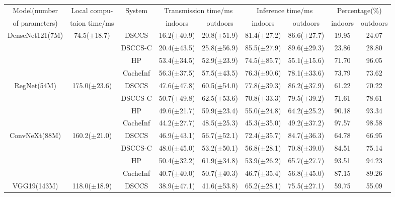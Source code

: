 \begin{table}[htb]

    \centering
\begin{tabular}{ccc|c|c|c|c|c|c}
\toprule
 Model(number&  Local compu- & \multirow[c]{2}{*}{System} & \multicolumn{2}{|c|}{Transmission time/ms} & \multicolumn{2}{|c|}{Inference time/ms} & \multicolumn{2}{c}{Percentage(\%)} \\
 of parameters) & taion time/ms &  & indoors & outdoors & indoors & outdoors & indoors & outdoors \\
\midrule
\multirow[c]{4}{*}{DenseNet121(7M)} & \multirow[c]{4}{*}{74.5($\pm$18.7)} & DSCCS & 16.2($\pm$40.9) & 20.8($\pm$51.9) & 81.4($\pm$27.2) & 86.6($\pm$27.7) & 19.95 & 24.07 \\
 &  & DSCCS-C & 20.4($\pm$43.5) & 25.8($\pm$56.9) & 85.5($\pm$27.9) & 89.6($\pm$29.3) & 23.86 & 28.80 \\
 &  & HP & 53.4($\pm$34.5) & 52.9($\pm$23.9) & 74.5($\pm$85.7) & 55.1($\pm$15.6) & 71.70 & 96.05 \\
 &  & CacheInf & 56.3($\pm$37.5) & 57.5($\pm$43.5) & 76.3($\pm$90.6) & 78.1($\pm$33.6) & 73.79 & 73.62 \\
\cline{1-9} \cline{2-9}
\multirow[c]{4}{*}{RegNet(54M)} & \multirow[c]{4}{*}{175.0($\pm$23.6)} & DSCCS & 47.6($\pm$47.8) & 60.5($\pm$54.0) & 77.8($\pm$39.3) & 86.2($\pm$37.9) & 61.22 & 70.22 \\
 &  & DSCCS-C & 50.7($\pm$49.8) & 62.5($\pm$53.6) & 70.8($\pm$33.3) & 79.5($\pm$39.2) & 71.61 & 78.61 \\
 &  & HP & 49.6($\pm$21.7) & 59.9($\pm$23.4) & 55.0($\pm$24.8) & 64.2($\pm$25.2) & 90.18 & 93.34 \\
 &  & CacheInf & 44.2($\pm$27.7) & 48.5($\pm$25.3) & 45.3($\pm$35.0) & 49.2($\pm$37.2) & 97.57 & 98.58 \\
\cline{1-9} \cline{2-9}
\multirow[c]{4}{*}{ConvNeXt(88M)} & \multirow[c]{4}{*}{160.2($\pm$21.0)} & DSCCS & 46.9($\pm$43.1) & 56.7($\pm$52.1) & 72.4($\pm$35.7) & 84.7($\pm$36.3) & 64.78 & 66.95 \\
 &  & DSCCS-C & 48.0($\pm$45.0) & 53.2($\pm$50.1) & 56.8($\pm$28.1) & 70.8($\pm$39.0) & 84.51 & 75.14 \\
 &  & HP & 50.4($\pm$32.2) & 61.9($\pm$34.8) & 53.9($\pm$26.2) & 65.7($\pm$27.7) & 93.51 & 94.23 \\
 &  & CacheInf & 40.7($\pm$40.0) & 50.7($\pm$40.3) & 46.7($\pm$35.4) & 56.8($\pm$45.0) & 87.15 & 89.26 \\
\cline{1-9} \cline{2-9}
\multirow[c]{4}{*}{VGG19(143M)} & \multirow[c]{4}{*}{118.0($\pm$18.9)} & DSCCS & 38.9($\pm$47.1) & 41.6($\pm$53.8) & 65.2($\pm$28.1) & 75.5($\pm$27.1) & 59.75 & 55.09 \\

\end{tabular}
\end{table}
